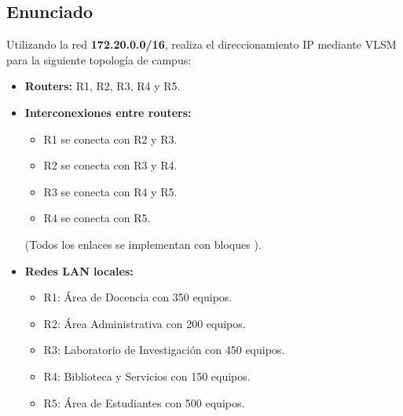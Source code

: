 \documentclass[a4paper,12pt]{article}
\begin{document}
\subsection{Enunciado}
Utilizando la red \textbf{172.20.0.0/16}, realiza el direccionamiento IP mediante VLSM para la siguiente topología de campus:
\begin{itemize}
  \item \textbf{Routers:} R1, R2, R3, R4 y R5.
  \item \textbf{Interconexiones entre routers:}
    \begin{itemize}
      \item R1 se conecta con R2 y R3.
      \item R2 se conecta con R3 y R4.
      \item R3 se conecta con R4 y R5.
      \item R4 se conecta con R5.
    \end{itemize}
    (Todos los enlaces se implementan con bloques \texttt{}).
  \item \textbf{Redes LAN locales:}
    \begin{itemize}
      \item R1: Área de Docencia con 350 equipos.
      \item R2: Área Administrativa con 200 equipos.
      \item R3: Laboratorio de Investigación con 450 equipos.
      \item R4: Biblioteca y Servicios con 150 equipos.
      \item R5: Área de Estudiantes con 500 equipos.
    \end{itemize}
\end{itemize}
\end{document}
